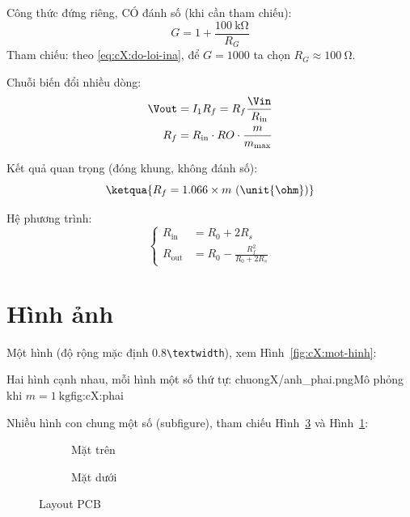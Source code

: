 Công thức đứng riêng, CÓ đánh số (khi cần tham chiếu):
\begin{equation}
    G = 1 + \frac{\qty{100}{\kilo\ohm}}{R_G}
    \label{eq:cX:do-loi-ina}
\end{equation}
Tham chiếu: theo \eqref{eq:cX:do-loi-ina}, để $G = 1000$ ta chọn $R_G \approx \qty{100}{\ohm}$.

Chuỗi biến đổi nhiều dòng:
\begin{align}
    \Vout &= I_1 R_f = R_f \frac{\Vin}{R_{\mathrm{in}}} \label{eq:cX:vout} \\
    R_f   &= R_{\mathrm{in}} \cdot RO \cdot \frac{m}{m_{\max}} \label{eq:cX:rf}
\end{align}

Kết quả quan trọng (đóng khung, không đánh số):
\[
    \ketqua{R_f = 1.066 \times m \ (\unit{\ohm})}
\]

Hệ phương trình:
\begin{equation}
    \left\{
    \begin{aligned}
        R_{\mathrm{in}}  &= R_0 + 2R_s \\
        R_{\mathrm{out}} &= R_0 - \frac{R_f^2}{R_0 + 2R_s}
    \end{aligned}
    \right.
    \label{eq:cX:he-pt}
\end{equation}

\section{Hình ảnh}
\label{sec:cX:hinh-anh}

Một hình (độ rộng mặc định 0.8\verb|\textwidth|), xem Hình~\ref{fig:cX:mot-hinh}:

Hai hình cạnh nhau, mỗi hình một số thứ tự:
%
        {chuongX/anh_phai.png}{Mô phỏng khi $m = \qty{1}{\kilo\gram}$}{fig:cX:phai}

Nhiều hình con chung một số (subfigure), tham chiếu Hình~\ref{fig:cX:pcb} và Hình~\ref{fig:cX:pcb-top}:
\begin{figure}[H]
    \centering
    \begin{subfigure}[t]{0.47\textwidth}
        \centering
        \caption{Mặt trên}
        \label{fig:cX:pcb-top}
    \end{subfigure}\hfill
    \begin{subfigure}[t]{0.47\textwidth}
        \centering
        \caption{Mặt dưới}
        \label{fig:cX:pcb-bottom}
    \end{subfigure}
    \caption{Layout PCB}
    \label{fig:cX:pcb}
\end{figure}

